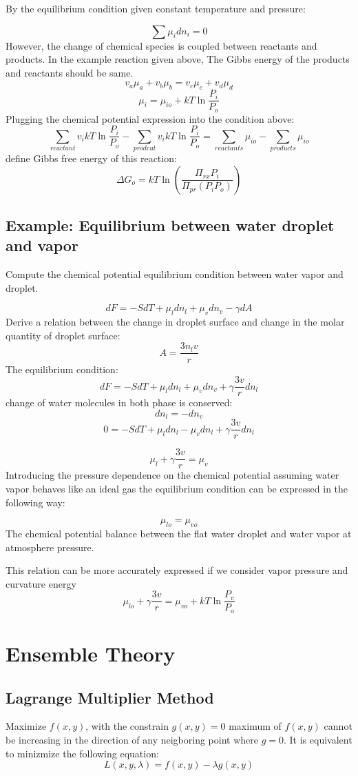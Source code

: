 \documentclass[12pt, oneside]{article}   	%
\begin{document}
By the equilibrium condition given constant temperature and pressure: 

$$\sum \mu_i dn_i =0 $$
However, the change of chemical species is coupled between reactants and products. In the example reaction given above,  The Gibbs energy of the products and reactants should be same. 
$$v_a \mu_a  + v_b \mu_b = v_c \mu_c + v_d \mu_d$$
$$\mu_i =\mu_{io} + k T \ln \frac{P_i}{P_o} $$
Plugging the chemical potential expression into the condition above: 
$$\sum_{reactant} v_i kT \ln \frac{P_i}{P_o} -\sum_{prodcut} v_i kT \ln \frac{P_i}{P_o} = \sum_{reactants} \mu_{io} - \sum_{products} \mu_{io}$$
define Gibbs free energy of this reaction: 
$$\Delta G_o = k T \ln (\frac{\Pi_{rx}P_i}{\Pi_{pr}(P_i P_o)})$$
\subsection*{Example: Equilibrium between water droplet and vapor}
\par 
Compute the chemical potential equilibrium condition between water vapor and droplet.  
\par
$$dF = -S dT + \mu_l dn_l + \mu_v dn_v - \gamma dA$$
Derive a relation between the change in droplet surface and change in the molar quantity of droplet surface: 
$$A = \frac{3 n_l v}{r}$$ 
The equilibrium condition: 
$$dF = -S dT + \mu_l dn_l + \mu_v dn_v + \gamma \frac{3 v}{r} dn_l$$
change of water molecules in both phase is conserved:
$$dn_l = -dn_v$$
$$0 = -S dT + \mu_l dn_l - \mu_v dn_l + \gamma \frac{3 v}{r} dn_l$$

$$\mu_l + \gamma \frac{3 v}{r} = \mu_v$$
Introducing the pressure dependence on the chemical potential assuming water vapor behaves like an ideal gas the equilibrium condition can be expressed in the following way: 

$$\mu_{lo}  = \mu_{vo}$$
The chemical potential balance between the flat water droplet and water vapor at atmosphere pressure.

This relation can be more accurately expressed if we consider vapor pressure and curvature energy 
$$\mu_{lo} +  \gamma \frac{3 v}{r} = \mu_{vo} + kT \ln \frac{P_v}{P_o}$$

\section{Ensemble Theory}

\subsection{Lagrange Multiplier Method} 
\par 
Maximize $f(x,y)$, with the constrain $g(x,y) = 0$
maximum of $f(x,y)$ cannot be increasing in the direction of any neigboring point where $g = 0$. It is equivalent to minizmize the following equation: 
$$L(x, y, \lambda) = f(x,y) - \lambda  g(x,y)$$
\end{document}
